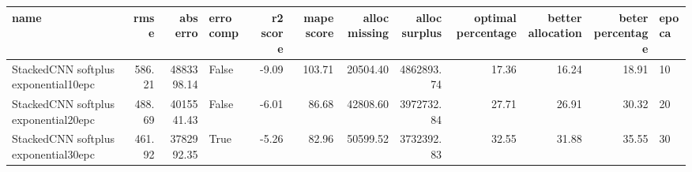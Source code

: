 \begin{tabular}{lrrlrrrrrrrl}
\toprule
name & rmse & abs erro & erro comp & r2 score & mape score & alloc missing & alloc surplus & optimal percentage & better allocation & beter percentage & epoca \\
\midrule
StackedCNN softplus exponential10epc & 586.21 & 4883398.14 & False & -9.09 & 103.71 & 20504.40 & 4862893.74 & 17.36 & 16.24 & 18.91 & 10 \\
StackedCNN softplus exponential20epc & 488.69 & 4015541.43 & False & -6.01 & 86.68 & 42808.60 & 3972732.84 & 27.71 & 26.91 & 30.32 & 20 \\
StackedCNN softplus exponential30epc & 461.92 & 3782992.35 & True & -5.26 & 82.96 & 50599.52 & 3732392.83 & 32.55 & 31.88 & 35.55 & 30 \\
\bottomrule
\end{tabular}
